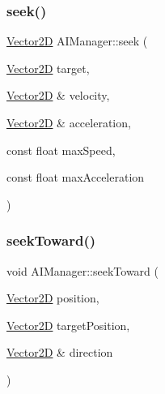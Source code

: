 \subsubsection{\texorpdfstring{seek()}{seek()}}
{\footnotesize\ttfamily \hyperlink{class_vector2_d}{Vector2D} A\+I\+Manager\+::seek (\begin{DoxyParamCaption}\item[{\hyperlink{class_vector2_d}{Vector2D}}]{target,  }\item[{\hyperlink{class_vector2_d}{Vector2D} \&}]{velocity,  }\item[{\hyperlink{class_vector2_d}{Vector2D} \&}]{acceleration,  }\item[{const float}]{max\+Speed,  }\item[{const float}]{max\+Acceleration }\end{DoxyParamCaption})\hspace{0.3cm}{\ttfamily [static]}}

\hypertarget{class_a_i_manager_af83d3d5dc2b853811b92c463a88e434f}{}\label{class_a_i_manager_af83d3d5dc2b853811b92c463a88e434f} 
\subsubsection{\texorpdfstring{seek\+Toward()}{seekToward()}}
{\footnotesize\ttfamily void A\+I\+Manager\+::seek\+Toward (\begin{DoxyParamCaption}\item[{\hyperlink{class_vector2_d}{Vector2D}}]{position,  }\item[{\hyperlink{class_vector2_d}{Vector2D}}]{target\+Position,  }\item[{\hyperlink{class_vector2_d}{Vector2D} \&}]{direction }\end{DoxyParamCaption})\hspace{0.3cm}{\ttfamily [static]}}

\hypertarget{class_a_i_manager_a5d0b2b08188e1e3ccf816480e70cd123}{}\label{class_a_i_manager_a5d0b2b08188e1e3ccf816480e70cd123} 
